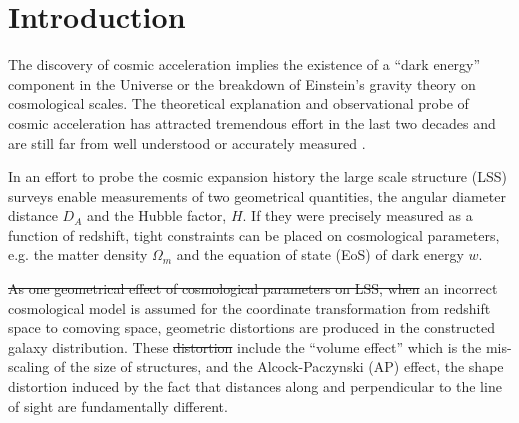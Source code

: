 \documentclass[iop]{emulateapj}
\providecommand{\DIFadd}[1]{{\protect\color{blue}\uwave{#1}}} %
\providecommand{\DIFdel}[1]{{\protect\color{red}\sout{#1}}}                      %
\providecommand{\DIFaddbegin}{} %
\providecommand{\DIFaddend}{} %
\providecommand{\DIFdelbegin}{} %
\providecommand{\DIFdelend}{} %
\begin{document}
\section{Introduction}

The discovery of cosmic acceleration \citep{Riess1998,Perl1999} implies the existence of a ``dark energy'' component in the Universe 
or the breakdown of Einstein's gravity theory on cosmological scales.
The theoretical explanation and observational probe of cosmic acceleration has attracted 
tremendous effort in the last two decades and are still far from well understood or accurately measured \citep{SW1989,Li2011,DHW2013}.


In an effort to probe the cosmic expansion history the large scale structure (LSS) surveys enable measurements of two geometrical quantities, 
the angular diameter distance $D_A$ and the Hubble factor, $H$. 
If they were precisely measured as a function of redshift, 
tight constraints can be placed on cosmological parameters, 
e.g. the matter density $\Omega_m$ and the equation of state (EoS) of dark energy $w$.

\DIFdelbegin \DIFdel{As one geometrical effect of cosmological parameters on LSS,  
when }\DIFdelend %
\DIFaddbegin \DIFadd{When }\DIFaddend an incorrect cosmological model is assumed for the coordinate transformation from redshift space to comoving space,
geometric distortions are produced in the constructed galaxy distribution. 
These \DIFdelbegin \DIFdel{distortion }\DIFdelend \DIFaddbegin \DIFadd{distortions }\DIFaddend include the ``volume effect'' which is the mis-scaling of the size of structures,
and the Alcock-Paczynski (AP) effect, the shape distortion induced by the fact that distances along and perpendicular to the line of sight are fundamentally different.
\end{document}
